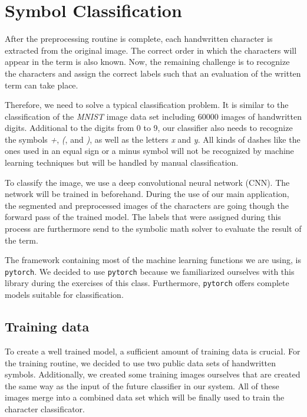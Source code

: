 \documentclass[12pt]{article}
\begin{document}
\section{Symbol Classification}
After the preprocessing routine is complete, each handwritten character is extracted from the original image. The correct order in which the characters will appear in the term is also known. Now, the remaining challenge is to recognize the characters and assign the correct labels such that an evaluation of the written term can take place.
	
	Therefore, we need to solve a typical classification problem. It is similar to the classification of the \textit{MNIST} image data set including 60000 images of handwritten digits. Additional to the digits from 0 to 9, our classifier also needs to recognize the symbols \textit{+}, \textit{(}, and \textit{)}, as well as the letters \textit{x} and \textit{y}. All kinds of dashes like the ones used in an equal sign or a minus symbol will not be recognized by machine learning techniques but will be handled by manual classification.
	
	To classify the image, we use a deep convolutional neural network (CNN). The network will be trained in beforehand. During the use of our main application, the segmented and preprocessed images of the characters are going though the forward pass of the trained model. The labels that were assigned during this process are furthermore send to the symbolic math solver to evaluate the result of the term. 
	
	The framework containing most of the machine learning functions we are using, is \texttt{pytorch}. We decided to use \texttt{pytorch} because we familiarized ourselves with this library during the exercises of this class. Furthermore, \texttt{pytorch} offers complete models suitable for classification.
		
	
	\subsection{Training data}
		To create a well trained model, a sufficient amount of training data is crucial. For the training routine, we decided to use two public data sets of handwritten symbols. Additionally, we created some training images ourselves that are created the same way as the input of the future classifier in our system. All of these images merge into a combined data set which will be finally used to train the character classificator.
		
\end{document}
